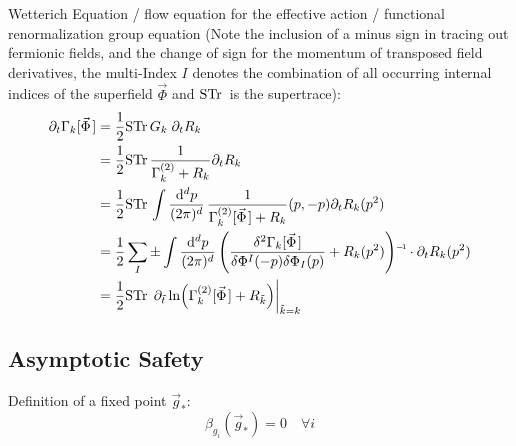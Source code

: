 		\noindent
		Wetterich Equation / flow equation for the effective action / functional renormalization group equation (Note the inclusion of a minus sign in tracing out fermionic fields, and the change of sign for the momentum of transposed field derivatives, the multi-Index $I$ denotes the combination of all occurring internal indices of the superfield $\vec{\Phi}$ and $\mathrm{STr}\,$ is the supertrace):
		\begin{equation}
			\begin{aligned}
				\partial_t \Gamma_k[\vec{\Phi}] 
				&= \frac{1}{2} \Str G_k \;\partial_t R_k \\
				&= \frac{1}{2} \Str \frac{1}{\Gamma^{(2)}_k + R_k} \partial_t R_k \\
				&= \frac{1}{2} \Str \int \frac{\dd^d p}{(2\pi)^d} \, \frac{1}{\Gamma^{(2)}_k[\vec{\Phi}] + R_k}(p,-p) \partial_t R_k(p^2) \\
				&= \frac{1}{2} \sum_I \pm \int \frac{\dd^d p}{(2\pi)^d} \, \inv{\qty(\frac{\delta^2 \Gamma_k[\vec{\Phi}]}{\delta \Phi^I(-p) \delta \Phi_I(p)} + R_k(p^2))} \cdot \partial_t R_k(p^2) \\
				&= \frac{1}{2} \Str \eval{\partial_{\tilde{t}} \ln(\Gamma^{(2)}_k[\vec{\Phi}] + R_{\tilde{k}})}_{\tilde{k} = k}
			\end{aligned}
		\end{equation}

	\subsection{Asymptotic Safety}
		\noindent
		Definition of a fixed point $\vec{g}_{*}$:
		\begin{equation}
			\beta_{g_i}(\vec{g}_{*}) = 0 \quad \forall i
		\end{equation}

